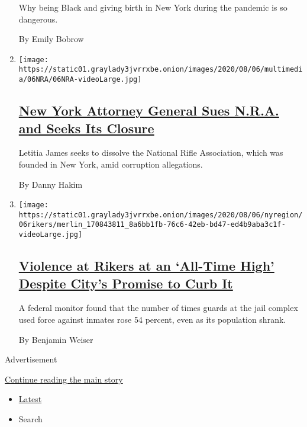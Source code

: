 \begin{enumerate}
  Why being Black and giving birth in New York during the pandemic is so
  dangerous.

  By Emily Bobrow
\item
  \texttt{[image: https://static01.graylady3jvrrxbe.onion/images/2020/08/06/multimedia/06NRA/06NRA-videoLarge.jpg]}

  \hypertarget{new-york-attorney-general-sues-nra-and-seeks-its-closure}{%
  \subsection{\texorpdfstring{\href{/2020/08/06/us/ny-nra-lawsuit-letitia-james.html}{New
  York Attorney General Sues N.R.A. and Seeks Its
  Closure}}{New York Attorney General Sues N.R.A. and Seeks Its Closure}}\label{new-york-attorney-general-sues-nra-and-seeks-its-closure}}

  Letitia James seeks to dissolve the National Rifle Association, which
  was founded in New York, amid corruption allegations.

  By Danny Hakim
\item
  \texttt{[image: https://static01.graylady3jvrrxbe.onion/images/2020/08/06/nyregion/06rikers/merlin\_170843811\_8a6bb1fb-76c6-42eb-bd47-ed4b9aba3c1f-videoLarge.jpg]}

  \hypertarget{violence-at-rikers-at-an-all-time-high-despite-citys-promise-to-curb-it}{%
  \subsection{\texorpdfstring{\href{/2020/08/06/nyregion/rikers-island-violence-guards.html}{Violence
  at Rikers at an `All-Time High' Despite City's Promise to Curb
  It}}{Violence at Rikers at an `All-Time High' Despite City's Promise to Curb It}}\label{violence-at-rikers-at-an-all-time-high-despite-citys-promise-to-curb-it}}

  A federal monitor found that the number of times guards at the jail
  complex used force against inmates rose 54 percent, even as its
  population shrank.

  By Benjamin Weiser
\end{enumerate}

Advertisement

\protect\hyperlink{after-mid1}{Continue reading the main story}

\begin{itemize}
\tightlist
\item
  \protect\hyperlink{stream-panel}{Latest}
\item
  Search
\end{itemize}

